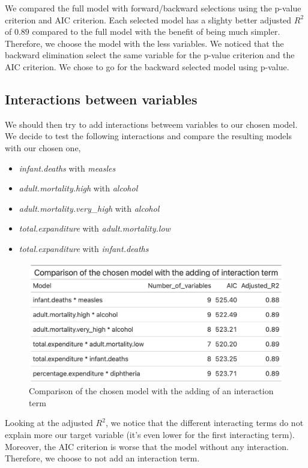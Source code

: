 We compared the full model with forward/backward selections using the p-value criterion and AIC criterion. Each selected model has a slighty better adjusted $R^2$ of $0.89$ compared to the full model with the benefit of being much simpler. Therefore, we choose the model with the less variables. We noticed that the backward elimination select the same variable for the p-value criterion and the AIC criterion. We chose to go for the backward selected model using p-value.

\subsection{Interactions between variables}

We should then try to add interactions betweem variables to our chosen model. We decide to test the following interactions and compare the resulting models with our chosen one,

\begin{itemize}
	\item \textit{infant.deaths} with \textit{measles}
	\item \textit{adult.mortality.high} with \textit{alcohol}
	\item \textit{adult.mortality.very\_high} with \textit{alcohol}
	\item \textit{total.expanditure} with \textit{adult.mortality.low}
	\item \textit{total.expanditure} with \textit{infant.deaths}
\end{itemize}

\begin{figure}[H]
	\centering
	\includegraphics{figures/models/models_interactions.png}
	\caption{Comparison of the chosen model with the adding of an interaction term}
	\label{fig:models_interaction}
\end{figure}

Looking at the adjusted $R^2$, we notice that the different interacting terms do not explain more our target variable (it's even lower for the first interacting term). Moreover, the AIC criterion is worse that the model without any interaction. Therefore, we choose to not add an interaction term.

